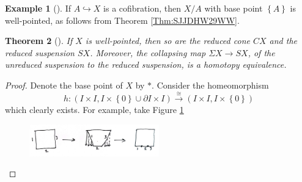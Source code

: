 \documentclass[reqno]{amsart}
\newtheorem{theorem}{Theorem}[section]
\theoremstyle{definition}
\newtheorem{example}[theorem]{Example}
\theoremstyle{remark}
\begin{document}
\begin{example}[]
    If $A \hookrightarrow X$ is a cofibration, then
    $X / A$ with base point $\left\{ A \right\} $ is well-pointed,
    as follows from Theorem \ref{Thm:SJJDHW29WW}.
\end{example}

\begin{theorem}[]
    If $X$ is well-pointed, then so are the reduced
    cone $CX$ and the reduced suspension $SX$. Moreover,
    the collapsing map  $\Sigma X \to SX$, of the unreduced
    suspension to the reduced suspension, is a homotopy
    equivalence.
\end{theorem}

\begin{proof}
    Denote the base point of $X$ by $*$.
    Consider the homeomorphism
    \[
    h \colon \left( I \times I,
    I \times \left\{ 0 \right\} \cup 
\partial I \times I \right) 
\stackrel{\cong}{\to} \left( I \times I, I \times 
\left\{ 0 \right\} \right) 
    \] 
    which clearly exists. For example, take Figure
    \ref{fig:IWIDK01-jpeg}
    \begin{figure}[htpb]
        \centering
        \includegraphics[width=0.5\textwidth]{Figures/IWIDK01.jpeg}
        \caption{}
        \label{fig:IWIDK01-jpeg}
    \end{figure}


\end{proof}
\end{document}
